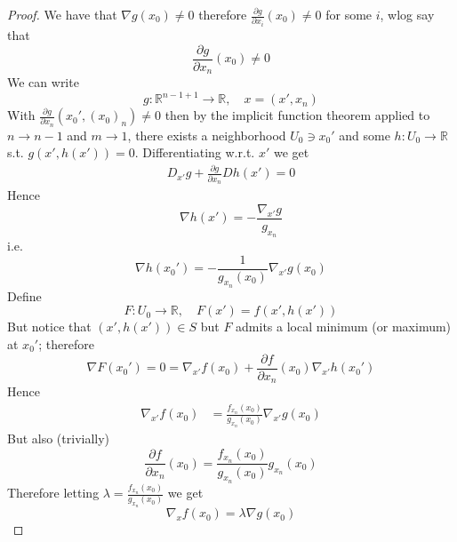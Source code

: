 \documentclass[11pt,a4paper]{article}
\theoremstyle{definition}
\theoremstyle{plain}
\theoremstyle{remark}
\newcommand{\R}{\mathbb{R}}
\begin{document}
\begin{proof}
    We have that $\nabla g(x_0) \ne 0$ therefore $\frac{\partial g}{\partial x_i} (x_0) \ne 0$ for some $i$, wlog say that 
    $$\frac{\partial g}{\partial x_n} (x_0) \ne 0$$
    We can write 
    $$g \colon \R^{n-1 + 1} \to \R, \quad x = (x', x_n)$$
    With $\frac{\partial g}{\partial x_n} (x_0', (x_{0})_n) \ne 0$ then by the implicit function theorem applied to $n \to n-1$ and $m \to 1$, 
    there exists a neighborhood $U_{0} \ni x_0'$ and some $h \colon U_0 \to \R$ s.t. $g(x', h(x')) = 0$. Differentiating w.r.t. $x'$ we get 
    \begin{align*}
        D_{x'}g + \frac{\partial g}{\partial x_n} Dh(x') = 0
    \end{align*} 
    Hence 
    $$\nabla h(x') = - \frac{\nabla_{x'}g}{g_{x_n}}$$
    i.e. 
    $$\nabla h(x_0') = -\frac{1}{g_{x_n} (x_0)} \nabla_{x'} g(x_0)$$
    Define 
    $$F \colon U_0 \to \R, \quad F(x') = f(x', h(x'))$$
    But notice that $(x', h(x')) \in S$ but $F$ admits a local minimum (or maximum) at $x_0'$; therefore 
    $$\nabla F(x_0') = 0 = \nabla_{x'} f(x_0) + \frac{\partial f}{\partial x_n} (x_0) \nabla_{x'} h(x_0')$$
    Hence 
    \begin{align*}
        \nabla_{x'} f(x_0) &= \frac{f_{x_n} (x_0)}{g_{x_n} (x_0)} \nabla_{x'} g(x_0)
    \end{align*}
    But also (trivially)
    $$\frac{\partial f}{\partial x_n} (x_0) = \frac{f_{x_n} (x_0)}{g_{x_n} (x_0)} g_{x_n} (x_0)$$
    Therefore letting $\lambda = \frac{f_{x_n} (x_0)}{g_{x_n} (x_0)}$ we get 
    $$\nabla_x f(x_0) = \lambda \nabla g(x_0)$$
\end{proof}
\end{document}
